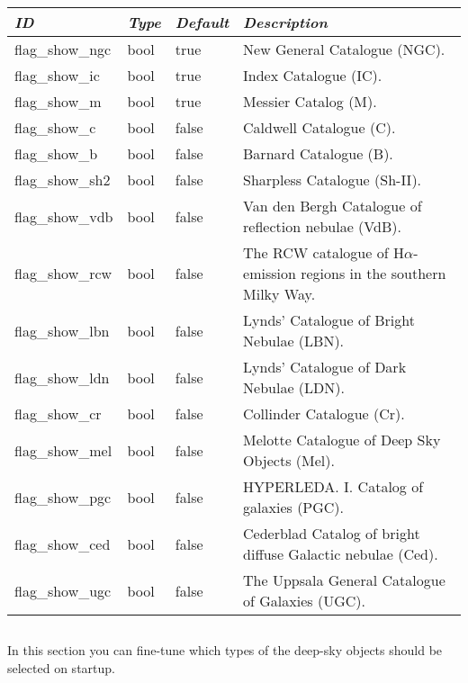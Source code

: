 \begin{longtabu} to \textwidth {l|l|l|X}\toprule
\emph{ID} & \emph{Type} & \emph{Default} & \emph{Description}\\\midrule
flag\_show\_ngc & bool & true  & New General Catalogue (NGC). \\\midrule
flag\_show\_ic  & bool & true  & Index Catalogue (IC). \\\midrule
flag\_show\_m   & bool & true  & Messier Catalog (M). \\\midrule
flag\_show\_c   & bool & false & Caldwell Catalogue (C). \\\midrule
flag\_show\_b   & bool & false & Barnard Catalogue (B). \\\midrule
flag\_show\_sh2 & bool & false & Sharpless Catalogue (Sh-II). \\\midrule
flag\_show\_vdb & bool & false & Van den Bergh Catalogue of reflection nebulae (VdB). \\\midrule
flag\_show\_rcw & bool & false & The RCW catalogue of H$\alpha$-emission regions in the southern Milky Way. \\\midrule
flag\_show\_lbn & bool & false & Lynds' Catalogue of Bright Nebulae (LBN). \\\midrule
flag\_show\_ldn & bool & false & Lynds' Catalogue of Dark Nebulae (LDN). \\\midrule
flag\_show\_cr  & bool & false & Collinder Catalogue (Cr). \\\midrule
flag\_show\_mel & bool & false & Melotte Catalogue of Deep Sky Objects (Mel).  \\\midrule
flag\_show\_pgc & bool & false & HYPERLEDA. I. Catalog of galaxies (PGC). \\\midrule
flag\_show\_ced & bool & false & Cederblad Catalog of bright diffuse Galactic nebulae (Ced). \\\midrule
flag\_show\_ugc & bool & false & The Uppsala General Catalogue of Galaxies (UGC). \\\bottomrule
\end{longtabu}

\subsection{}
\label{sec:config.ini:dso_type_filters}
In this section you can fine-tune which types of the deep-sky objects should be selected on startup.

